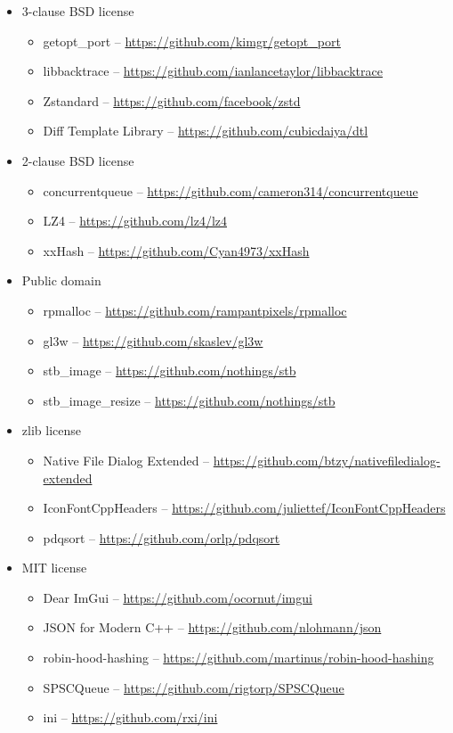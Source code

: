 \documentclass[hidelinks,titlepage,a4paper,twoside]{article}
\begin{document}
\begin{itemize}
\item 3-clause BSD license
\begin{itemize}
\item getopt\_port -- \url{https://github.com/kimgr/getopt\_port}
\item libbacktrace \faStar{} -- \url{https://github.com/ianlancetaylor/libbacktrace}
\item Zstandard -- \url{https://github.com/facebook/zstd}
\item Diff Template Library -- \url{https://github.com/cubicdaiya/dtl}
\end{itemize}

\item 2-clause BSD license
\begin{itemize}
\item concurrentqueue \faStar{} -- \url{https://github.com/cameron314/concurrentqueue}
\item LZ4 \faStar{} -- \url{https://github.com/lz4/lz4}
\item xxHash -- \url{https://github.com/Cyan4973/xxHash}
\end{itemize}

\item Public domain
\begin{itemize}
\item rpmalloc \faStar{} -- \url{https://github.com/rampantpixels/rpmalloc}
\item gl3w -- \url{https://github.com/skaslev/gl3w}
\item stb\_image -- \url{https://github.com/nothings/stb}
\item stb\_image\_resize -- \url{https://github.com/nothings/stb}
\end{itemize}

\item zlib license
\begin{itemize}
\item Native File Dialog Extended -- \url{https://github.com/btzy/nativefiledialog-extended}
\item IconFontCppHeaders -- \url{https://github.com/juliettef/IconFontCppHeaders}
\item pdqsort -- \url{https://github.com/orlp/pdqsort}
\end{itemize}

\item MIT license
\begin{itemize}
\item Dear ImGui -- \url{https://github.com/ocornut/imgui}
\item JSON for Modern C++ -- \url{https://github.com/nlohmann/json}
\item robin-hood-hashing -- \url{https://github.com/martinus/robin-hood-hashing}
\item SPSCQueue \faStar{} -- \url{https://github.com/rigtorp/SPSCQueue}
\item ini -- \url{https://github.com/rxi/ini}
\end{itemize}


\end{itemize}
\end{document}
